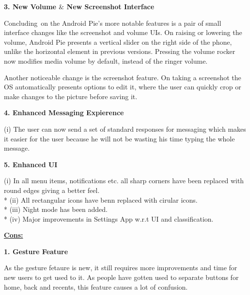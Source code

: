 \documentclass[12pt]{article}
\begin{document}
\textbf{\textcolor[HTML]{4A4A4A}{3. New Volume $\&$  New Screenshot Interface}}\par

\textcolor[HTML]{4A4A4A}{Concluding\ on the Android Pie's more notable features is a pair of small interface changes like the screenshot and volume UIs. On raising or lowering the volume, Android Pie presents a vertical slider on the right side of the phone, unlike the horizontal element in previous versions. Pressing the volume rocker now modifies media volume by default, instead of the ringer volume.  }\par

\textcolor[HTML]{4A4A4A}{Another noticeable change is the screenshot feature. On taking a screenshot the OS automatically presents options to edit it, where the user can quickly crop or make changes to the picture before saving it.}\par

\textbf{\textcolor[HTML]{4A4A4A}{4. Enhanced Messaging Expierence}}\par

\textcolor[HTML]{4A4A4A}{(i) The user can now send a set of standard responses for messaging which makes it easier for the user because he will not be wasting his time typing the whole message.}\par

\textbf{\textcolor[HTML]{4A4A4A}{5. Enhanced UI}}\par

\textcolor[HTML]{4A4A4A}{(i) In all menu items, notifications etc. all sharp corners have been replaced with round edges giving a better feel.\\*
(ii) All rectangular icons have benn replaced with cirular icons. \\* (iii) Night mode has been added.\\* (iv) Major improvements in Settings App w.r.t UI and classification.}\par


{\fontsize{18pt}{21.6pt}\selectfont \textbf{\uline{Cons:}}\par}\par
{}

\textbf{\textcolor[HTML]{4A4A4A}{1. Gesture Feature}}\par

\textcolor[HTML]{4A4A4A}{As the gesture fetaure is new, it still requires more improvements and time for new users to get used to it. As people have gotten used to separate buttons for home, back and recents, this feature causes a lot of confusion.}\par
\end{document}
